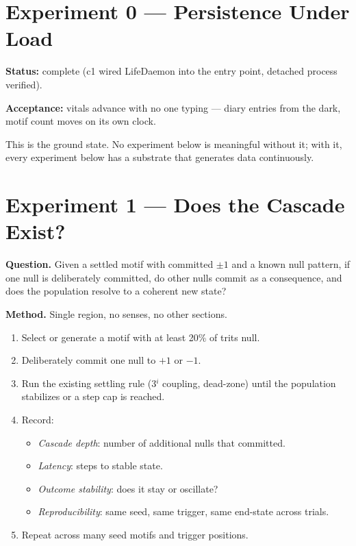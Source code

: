 \documentclass[11pt]{article}
\begin{document}
\section{Experiment 0 --- Persistence Under Load}

\textbf{Status:} complete (c1 wired LifeDaemon into the entry point,
detached process verified).

\textbf{Acceptance:} vitals advance with no one typing --- diary
entries from the dark, motif count moves on its own clock.

This is the ground state. No experiment below is meaningful without
it; with it, every experiment below has a substrate that generates
data continuously.

\section{Experiment 1 --- Does the Cascade Exist?}

\textbf{Question.} Given a settled motif with committed $\pm 1$ and a
known null pattern, if one null is deliberately committed, do other
nulls commit as a consequence, and does the population resolve to a
coherent new state?

\textbf{Method.} Single region, no senses, no other sections.
\begin{enumerate}[leftmargin=*]
\item Select or generate a motif with at least 20\% of trits null.
\item Deliberately commit one null to $+1$ or $-1$.
\item Run the existing settling rule (3$^i$ coupling, dead-zone) until
      the population stabilizes or a step cap is reached.
\item Record:
      \begin{itemize}
      \item \emph{Cascade depth}: number of additional nulls that
            committed.
      \item \emph{Latency}: steps to stable state.
      \item \emph{Outcome stability}: does it stay or oscillate?
      \item \emph{Reproducibility}: same seed, same trigger, same
            end-state across trials.
      \end{itemize}
\item Repeat across many seed motifs and trigger positions.
\end{enumerate}
\end{document}
